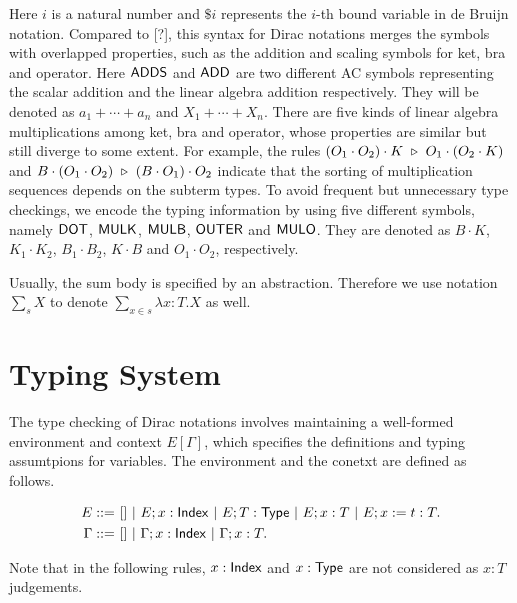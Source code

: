 \documentclass{article}
\begin{document}
Here $i$ is a natural number and $\$i$ represents the $i$-th bound variable in de Bruijn notation. 
Compared to [?], this syntax for Dirac notations merges the symbols with overlapped properties, such as the addition and scaling symbols for ket, bra and operator.
Here $\mathsf{ADDS}$ and $\mathsf{ADD}$ are two different AC symbols representing the scalar addition and the linear algebra addition respectively. They will be denoted as $a_1 + \cdots + a_n$ and $X_1 + \cdots + X_n$.
There are five kinds of linear algebra multiplications among ket, bra and operator, whose properties are similar but still diverge to some extent. For example, the rules $(O_1 \cdot O_2) \cdot K\ \triangleright\ O_1 \cdot (O_2 \cdot K)$ and $B \cdot (O_1 \cdot O_2) \ \triangleright\ (B \cdot O_1) \cdot O_2$ indicate that the sorting of multiplication sequences depends on the subterm types. To avoid frequent but unnecessary type checkings, we encode the typing information by using five different symbols, namely $\mathsf{DOT}$, $\mathsf{MULK}$, $\mathsf{MULB}$, $\mathsf{OUTER}$ and $\mathsf{MULO}$. They are denoted as $B\cdot K$, $K_1 \cdot K_2$, $B_1 \cdot B_2$, $K \cdot B$ and $O_1 \cdot O_2$, respectively.

Usually, the sum body is specified by an abstraction. Therefore we use notation $\sum_s X$ to denote $\sum_{x \in s} \lambda x : T . X$ as well.
 
\section{Typing System}
The type checking of Dirac notations involves maintaining a well-formed environment and context $E[\Gamma]$, which specifies the definitions and typing assumtpions for variables.
The environment and the conetxt are defined as follows.

\begin{definition}
    \begin{align*}
        E ::=\ & []\ |\ E; x : \Index\ |\ E; T : \Type\ |\ E; x : T\ |\ E; x := t : T. \\
        \Gamma ::=\ & []\ |\ \Gamma; x : \Index\ |\ \Gamma; x : T.
    \end{align*}
\end{definition}

Note that in the following rules, $x : \mathsf{Index}$ and $x : \mathsf{Type}$ are not considered as $x : T$ judgements.
\end{document}
